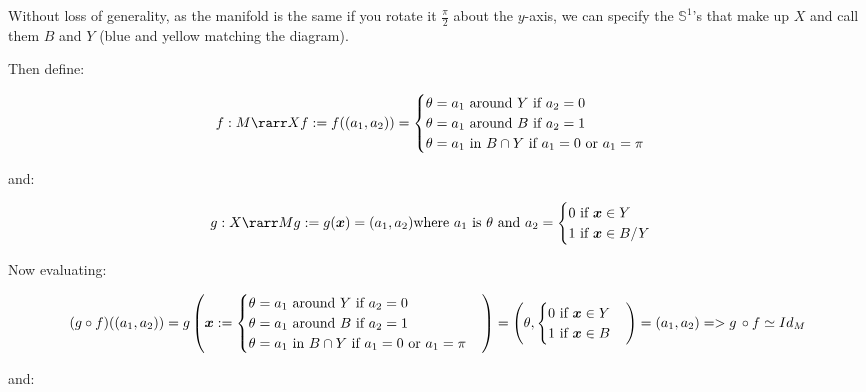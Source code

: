 \documentclass[
]{article}
\begin{document}
Without loss of generality, as the manifold is the same if you rotate it
\(\frac \pi 2\) about the \(y\)-axis, we can specify the
\(\mathbb S^1\)'s that make up \(X\) and call them \(B\) and \(Y\) (blue
and yellow matching the diagram).

Then define:

\[f: M \rarr X \\
f := f((a_1,a_2)) =
\begin{cases}
\theta = a_1 \text{ around } Y \text{ if } a_2 = 0
\\
\theta = a_1 \text{ around } B \text{ if } a_2 = 1
\\
\theta = a_1 \text{ in } B \cap Y  \text{ if } a_1 = 0 \text{ or } a_1 = \pi \\
\end{cases}\]

and:

\[\\
g: X \rarr M \\
g := g(\boldsymbol{x}) = (a_1, a_2)  \\
\text{where } a_1 \text{ is } \theta \text{ and }  a_2 = 
\begin{cases}
0 \text{ if } \boldsymbol x \in Y
\\
1 \text{ if } \boldsymbol x \in B/Y
\end{cases}\]

Now evaluating:

\[(g \circ f)((a_1,a_2)) = g \left( \boldsymbol x := \begin{cases}
\theta = a_1 \text{ around } Y \text{ if } a_2 = 0
\\

\theta = a_1 \text{ around } B \text{ if } a_2 = 1\\
\theta = a_1 \text{ in } B \cap Y  \text{ if } a_1 = 0 \text{ or } a_1 = \pi \\
\end{cases} \right) 

= 

\left( \theta, 
\begin{cases}
0 \text{ if } \boldsymbol x \in Y
\\
1 \text{ if } \boldsymbol x \in B
\end{cases}
\right)

= (a_1, a_2)

\\

=> g \, \circ f \simeq Id_{M}\]

and:
\end{document}
